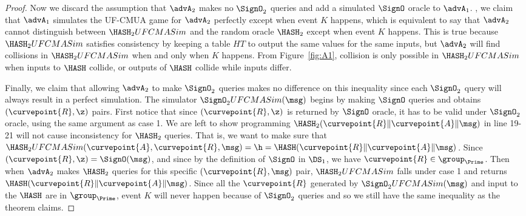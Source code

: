 \begin{proof}
	Now we discard the assumption that $\advA_2$ makes no $\SignO_2$ queries and add a simulated $\SignO$ oracle to $\advA_1$. , we claim that $\advA_1$ simulates the UF-CMUA game for $\advA_2$ perfectly except when event $K$ happens, which is equivalent to say that $\advA_2$ cannot distinguish between $\HASH_2UFCMASim$ and the random oracle $\HASH_2$ except when event $K$ happens. This is true because $\HASH_2UFCMASim$ satisfies consistency by keeping a table $HT$ to output the same values for the same inputs, but $\advA_2$ will find collisions in $\HASH_2UFCMASim$ when and only when $K$ happens. From Figure~\ref{fig:A1}, collision is only possible in $\HASH_2UFCMASim$ when inputs to $\HASH$ collide, or outputs of $\HASH$ collide while inputs differ. 
	
	Finally, we claim that allowing $\advA_2$ to make $\SignO_2$ queries makes no difference on this inequality since each $\SignO_2$ query will always result in a perfect simulation. The simulator $\SignO_2 UFCMASim(\msg)$ begins by making $\SignO$ queries and obtains $(\curvepoint{R}, \z)$ pairs. First notice that since $(\curvepoint{R}, \z)$ is returned by $\SignO$ oracle, it has to be valid under $\SignO_2$ oracle, using the same argument as case 1. We are left to show programming $\HASH_2(\curvepoint{R}\|\curvepoint{A}\| \msg)$ in line 19-21 will not cause inconsistency for $\HASH_2$ queries. That is, we want to make sure that $\HASH_2UFCMASim(\curvepoint{A}, \curvepoint{R},  \msg) = \h = \HASH(\curvepoint{R}\|\curvepoint{A}\| \msg)$. Since $(\curvepoint{R}, \z) = \SignO(\msg)$, and since by the definition of $\SignO$ in $\DS_1$, we have $\curvepoint{R} \in \group_{\Prime}$. Then when $\advA_2$ makes $\HASH_2$ queries for this specific $(\curvepoint{R}, \msg)$ pair, $\HASH_2UFCMASim$ falls under case 1 and returns $\HASH(\curvepoint{R}\|\curvepoint{A}\| \msg)$. Since all the $\curvepoint{R}$ generated by $\SignO_2 UFCMASim(\msg)$ and input to the $\HASH$ are in $\group_{\Prime}$, event $K$ will never happen because of $\SignO_2$ queries and so we still have the same inequality as the theorem claims.
	
\end{proof}

